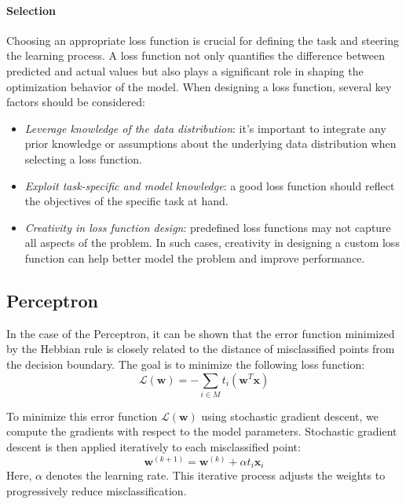 \paragraph*{Selection}
Choosing an appropriate loss function is crucial for defining the task and steering the learning process.
A loss function not only quantifies the difference between predicted and actual values but also plays a significant role in shaping the optimization behavior of the model.
When designing a loss function, several key factors should be considered:
\begin{itemize}
    \item \textit{Leverage knowledge of the data distribution}: it's important to integrate any prior knowledge or assumptions about the underlying data distribution when selecting a loss function. 
    \item \textit{Exploit task-specific and model knowledge}: a  good loss function should reflect the objectives of the specific task at hand.
    \item \textit{Creativity in loss function design}: predefined loss functions may not capture all aspects of the problem. 
        In such cases, creativity in designing a custom loss function can help better model the problem and improve performance.
\end{itemize}

\subsection{Perceptron}
In the case of the Perceptron, it can be shown that the error function minimized by the Hebbian rule is closely related to the distance of misclassified points from the decision boundary. 
The goal is to minimize the following loss function:
\[\mathcal{L}(\mathbf{w}) = -\sum_{i \in M} t_i (\mathbf{w}^T\mathbf{x})\]

To minimize this error function $\mathcal{L}(\mathbf{w})$ using stochastic gradient descent, we compute the gradients with respect to the model parameters. 
Stochastic gradient descent is then applied iteratively to each misclassified point:
\[\mathbf{w}^{(k+1)} = \mathbf{w}^{(k)} + \alpha t_i  \mathbf{x}_i \]
Here, $\alpha$ denotes the learning rate.
This iterative process adjusts the weights to progressively reduce misclassification.